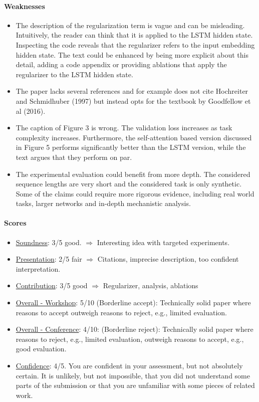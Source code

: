 \documentclass[11pt, a4paper]{include/gdm_format}
\begin{document}
\vspace{-1em}

\paragraph{Weaknesses}
\begin{itemize}
    \item The description of the regularization term is vague and can be misleading. Intuitively, the reader can think that it is applied to the LSTM hidden state. Inspecting the code reveals that the regularizer refers to the input embedding hidden state. The text could be enhanced by being more explicit about this detail, adding a code appendix or providing ablations that apply the regularizer to the LSTM hidden state.
    \item The paper lacks several references and for example does not cite Hochreiter and Schmidhuber (1997) but instead opts for the textbook by Goodfellow et al (2016).
    \item The caption of Figure 3 is wrong. The validation loss increases as task complexity increases. Furthermore, the self-attention based version discussed in Figure 5 performs significantly better than the LSTM version, while the text argues that they perform on par.
    \item The experimental evaluation could benefit from more depth. The considered sequence lengths are very short and the considered task is only synthetic. Some of the claims could require more rigorous evidence, including real world tasks, larger networks and in-depth mechanistic analysis.
\end{itemize}

\vspace{-1em}
\paragraph{Scores}
\begin{itemize}
    \item \underline{Soundness}: 3/5 good. $\Rightarrow$ Interesting idea with targeted experiments.
    \item \underline{Presentation}: 2/5 fair $\Rightarrow$ Citations, imprecise description, too confident interpretation.
    \item \underline{Contribution}: 3/5 good $\Rightarrow$ Regularizer, analysis, ablations
    \item \underline{Overall - Workshop}: 5/10 (Borderline accept): Technically solid paper where reasons to accept outweigh reasons to reject, e.g., limited evaluation.
    \item \underline{Overall - Conference}: 4/10: (Borderline reject): Technically solid paper where reasons to reject, e.g., limited evaluation, outweigh reasons to accept, e.g., good evaluation.
    \item \underline{Confidence}: 4/5. You are confident in your assessment, but not absolutely certain. It is unlikely, but not impossible, that you did not understand some parts of the submission or that you are unfamiliar with some pieces of related work.
\end{itemize}
\end{document}
